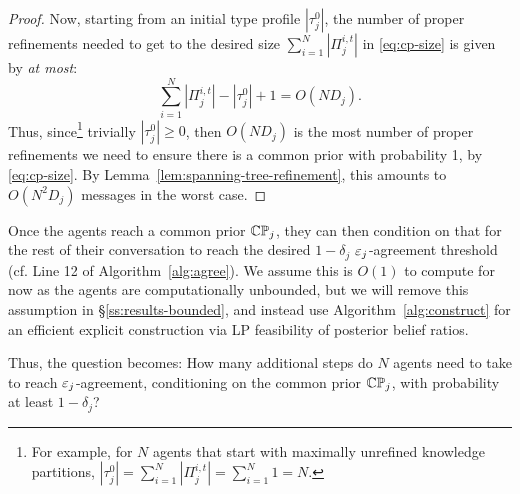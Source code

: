\begin{proof}
Now, starting from an initial type profile $|\tau^0_j|$, the number of proper refinements needed to get to the desired size $\sum_{i=1}^N \left|\Pi_j^{i, t}\right|$ in \eqref{eq:cp-size} is given by \emph{at most}:
\begin{equation*}
\sum_{i=1}^N \left|\Pi_j^{i, t}\right| - |\tau^0_j| + 1 = O\left(ND_j\right).
\end{equation*}
Thus, since\footnote{For example, for $N$ agents that start with maximally unrefined knowledge partitions, $|\tau^0_j| = \sum_{i = 1}^N \left|\Pi_j^{i, t}\right| = \sum_{i=1}^N 1 = N$.} trivially $|\tau^0_j| \ge 0$, then $O(ND_j)$ is the most number of proper refinements we need to ensure there is a common prior with probability 1, by \eqref{eq:cp-size}.
By Lemma~\ref{lem:spanning-tree-refinement}, this amounts to $O(N^2D_j)$ messages in the worst case.
\end{proof}

Once the agents reach a common prior $\mathbb{C}\mathbb{P}_j$, they can then condition on that for the rest of their conversation to reach the desired $1-\delta_j$ $\varepsilon_j$-agreement threshold (cf. Line 12 of Algorithm~\ref{alg:agree}).
We assume this is $O(1)$ to compute for now as the agents are computationally unbounded, but we will remove this assumption in \S\ref{ss:results-bounded}, and instead use Algorithm~\ref{alg:construct} for an efficient explicit construction via LP feasibility of posterior belief ratios.

Thus, the question becomes: How many additional steps do $N$ agents need to take to reach $\varepsilon_j$-agreement, conditioning on the common prior $\mathbb{C}\mathbb{P}_j$, with probability at least $1-\delta_j$?

